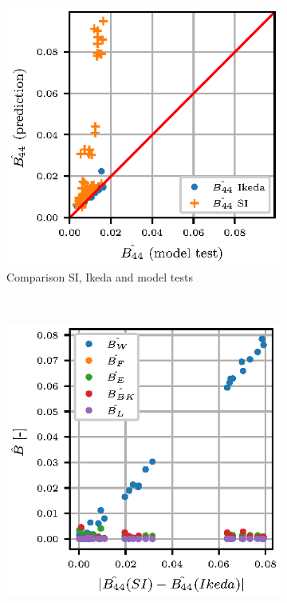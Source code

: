 \begin{figure}
    \centering
    \begin{subfigure}[b]{0.485\textwidth}
        \centering
        \includegraphics[width=\textwidth]{figures/si_ikeda_model.eps}
        \caption{Comparison SI, Ikeda and model tests}
        \label{fig:si_ikeda_model}
    \end{subfigure}
    ~ %
    \begin{subfigure}[b]{0.485\textwidth}
        \centering
        \includegraphics[width=\textwidth]{figures/component_residual.eps}

\end{subfigure}
\end{figure}
